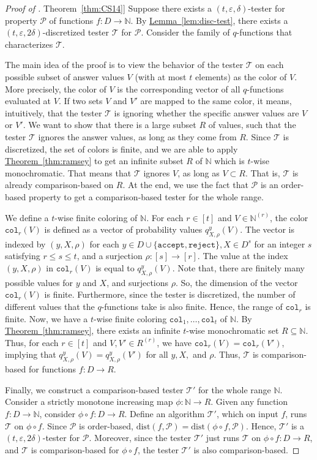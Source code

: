 \documentclass[11pt]{article}
\numberwithin{equation}{section}
\theoremstyle{definition}
\theoremstyle{plain}
\newcommand{\N}{\mathbb N}
\newcommand{\expref}[2]{\hyperref[#2]{#1~\ref{#2}}}
\newcommand{\eps}{\varepsilon}
\newcommand{\cP}{\ensuremath{\mathcal{P}}}
\newcommand{\cT}{\ensuremath{\mathcal{T}}}
\newcommand{\Thm}[1]{\expref{Theorem}{thm:#1}}
\newcommand{\Lem}[1]{\expref{Lemma}{lem:#1}}
\begin{document}
\begin{proof}[Proof of \Thm{CS14}]
Suppose there exists a $(t,\eps,\delta)$-tester for property $\cP$ of functions $f:D \to \N$. By \Lem{disc-test}, there exists a $(t,\eps,2\delta)$-discretized tester $\cT$ for $\cP$.
Consider the family of $q$-functions that characterizes $\cT$.

The main idea of the proof is to view the behavior of the tester $\cT$ on each possible subset of answer values $V$ (with at most $t$ elements) as the color of $V$. More precisely, the color of $V$ is the corresponding vector of all $q$-functions evaluated at $V$. If two sets $V$ and $V'$ are mapped to the same color, it means, intuitively, that the tester $\cT$ is ignoring whether the specific answer values are $V$ or $V'$. We want to show that there is a large subset $R$ of values, such that the tester $\cT$ ignores the answer values, as long as they come from $R$.
%
Since $\cT$ is discretized, the set of colors is finite, and we are able to apply \Thm{ramsey} to get an infinite subset $R$  of $\N$ which is $t$-wise monochromatic. That means that $\cT$ ignores $V$, as long as $V\subset R$. That is, $\cT$ is already comparison-based on $R$. At the end, we use the fact that $\cP$ is an order-based property to get a comparison-based tester for the whole range.

We define a $t$-wise finite coloring of $\N$. For each $r \in [t]$ and $V \in \N^{(r)}$, the color $\texttt{col}_r(V)$ is defined as a vector of probability values $q_{X,\rho}^y(V)$.
The vector is indexed by $(y, X, \rho)$ for each $y \in D \cup \{\texttt{accept}, \texttt{reject}\},  X \in D^s$ for an integer $s$ satisfying $r \leq s \leq t$, and a surjection
$\rho:[s] \to [r]$.
The value at the index $(y,X,\rho)$ in $\texttt{col}_r(V)$ is equal to $q_{X, \rho}^y (V)$.
Note that, there are finitely many possible values for $y$ and $X$, and surjections $\rho$.
%
%
So, the dimension of the vector $\texttt{col}_r(V)$ is finite. Furthermore, since the tester is discretized, the number of different values that the $q$-functions take is also finite. Hence, the range of $\texttt{col}_r$ is finite.
Now, we have a $t$-wise finite coloring $\texttt{col}_1, \ldots, \texttt{col}_t$ of $\N$.
By \Thm{ramsey}, there exists an infinite $t$-wise monochromatic set $R \subseteq \N$.
Thus, for each $r \in [t]$ and $V, V' \in R^{(r)}$, we have $\texttt{col}_r(V) = \texttt{col}_r(V')$, implying that $q_{X,\rho}^y (V) = q_{X,\rho}^y (V')$ for all $y, X,$
and %
$\rho$. Thus, $\cT$ is comparison-based for functions $f:D \to R$.

Finally, we construct a comparison-based tester $\cT'$ for the whole range $\N$. Consider a strictly monotone increasing map $\phi: \N \to R$. Given any function $f: D \to \N$, consider $\phi \circ f : D \to R$.
Define an algorithm $\cT'$, which on input $f$, runs $\cT$ on $\phi \circ f$.
Since $\cP$ is order-based, $\text{dist}(f, \cP) = \text{dist}(\phi \circ f, \cP)$.
Hence, $\cT'$ is a $(t,\eps, 2\delta)$-tester for $\cP$.
Moreover, since the tester $\cT'$ just runs $\cT$ on $\phi \circ f: D \to R$, and $\cT$ is comparison-based for $\phi \circ f$, the tester $\cT'$ is also comparison-based.
\end{proof}
\end{document}
